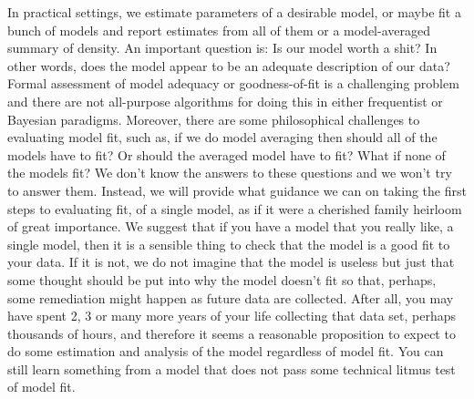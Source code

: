 In practical settings, we estimate parameters of a desirable model, or
maybe fit a bunch of models and report estimates from all of them or a
model-averaged summary of density.  An important question is: Is our
model worth a shit?  In other words, does the model appear to be an
adequate description of our data?
Formal assessment of model adequacy or goodness-of-fit is a
challenging problem and there are not all-purpose algorithms for doing
this in either frequentist or Bayesian paradigms. Moreover, there are
some philosophical challenges to evaluating model fit, such as, if we
do model averaging then should all of the models have to fit? Or
should the averaged model have to fit? What if none of the models fit?
We don't know the answers to these questions and we won't try to
answer them. Instead, we will provide what guidance we can on taking
the first steps to evaluating fit, of a single model, as if it were a
cherished family heirloom of great importance.  We suggest that if you
have a model that you really like, a single model, then it is a
sensible thing to check that the model is a good fit to your data. If
it is not, we do not imagine that the model is useless but just that
some thought should be put into why the model doesn't fit so that,
perhaps, some remediation might happen as future data are
collected. After all, you may have spent 2, 3 or many more years of
your life collecting that data set, perhaps thousands of hours, and
therefore it seems a reasonable proposition to expect to do some
estimation and analysis of the model regardless of model fit. You can
still learn something from a model that does not pass some technical
litmus test of model fit.

